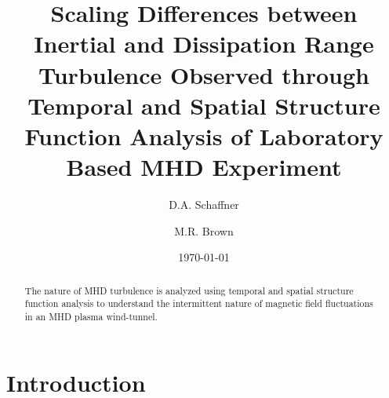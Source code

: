 \documentclass[aps,prl,amsmath,amssymb,reprint,superscriptaddress]{revtex4-1} %
\begin{document}
\title{Scaling Differences between Inertial and Dissipation Range Turbulence Observed through Temporal and Spatial Structure Function Analysis of Laboratory Based MHD Experiment}

\author{D.A. Schaffner}
\author{M.R. Brown}

\date{\today}
\begin{abstract}
The nature of MHD turbulence is analyzed using temporal and spatial structure function analysis to understand the intermittent nature of magnetic field fluctuations in an MHD plasma wind-tunnel.
\end{abstract}

\maketitle

\section{Introduction}
\end{document}

